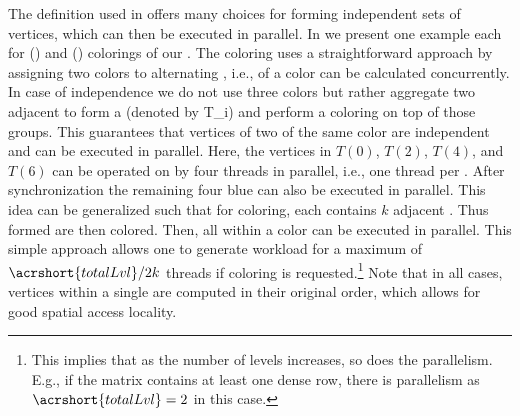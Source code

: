  
The definition used in  offers many choices for
forming \DK independent sets of vertices, which can then be executed
in parallel.  In  we present one example each
for \DONE () and \DTWO ()
colorings of our \stex. The \DONE coloring uses a straightforward
approach by assigning two colors to alternating \levels, i.e., \levels
of a color can be calculated concurrently. In case of \DTWO
independence we do not use three colors but rather aggregate two
adjacent \levels to form a \textit{\levelGroup} (denoted by
\acrshort{T_i}) and perform a \DONE coloring on top of those
groups. This guarantees that vertices of two \levelGroups of the same
color are \DTWO independent and can be executed in parallel. Here, the
vertices in $T(0)$, $T(2)$, $T(4)$, and $T(6)$ can be operated on by
four threads in parallel, i.e., one thread per \levelGroup.  After
synchronization the remaining four blue \levelGroups can also be
executed in parallel. This idea can be generalized such that for \DK
coloring, each \levelGroup contains $k$ adjacent \levels.
Thus formed \levelGroups are then \DONE
colored. Then, all \levelGroups within a color can be executed in
parallel. This simple approach allows one to generate workload for
a maximum of ${\acrshort{totalLvl}}/{2 k}$ threads if \DK coloring is
requested.\footnote{This implies that as the number of levels increases,
so does the parallelism. E.g., if the matrix contains at least one dense row,
 there is parallelism as $\acrshort{totalLvl}=2$ in this case.} 
Note that in all cases, vertices within a single \levelGroup
 are computed in their original order, which allows for good
spatial access locality.
 
